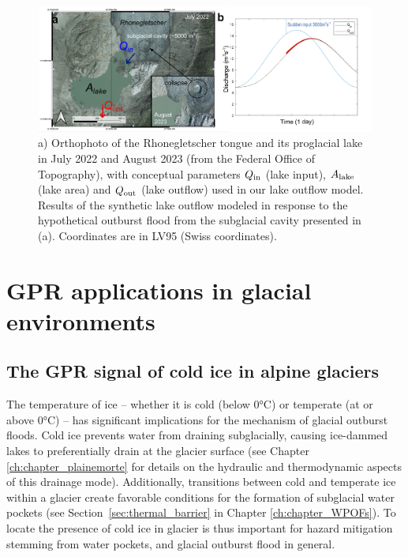 \begin{figure}[h]
    \centering
    \includegraphics[width=1\textwidth]{chapters/Discussion/WP_rhone.pdf}
    \caption{a) Orthophoto of the Rhonegletscher tongue and its proglacial lake in July 2022 and August 2023 (from the Federal Office of Topography), with conceptual parameters $Q_{\rm in}$ (lake input), $A_{\rm lake}$ (lake area) and $Q_{\rm out}$ (lake outflow) used in our lake outflow model. Results of the synthetic lake outflow modeled in response to the hypothetical outburst flood from the subglacial cavity presented in (a). Coordinates are in LV95 (Swiss coordinates).}
    \label{fig:WP_rhone}
\end{figure}



\section{GPR applications in glacial environments}


\subsection{The GPR signal of cold ice in alpine glaciers}

The temperature of ice -- whether it is cold (below 0°C) or temperate (at or above 0°C) -- has significant implications for the mechanism of glacial outburst floods. Cold ice prevents water from draining subglacially, causing ice-dammed lakes to preferentially drain at the glacier surface (see Chapter \ref{ch:chapter_plainemorte} for details on the hydraulic and thermodynamic aspects of this drainage mode). Additionally, transitions between cold and temperate ice within a glacier create favorable conditions for the formation of subglacial water pockets (see Section~\ref{sec:thermal_barrier} in Chapter \ref{ch:chapter_WPOFs}). To locate the presence of cold ice in glacier is thus important for hazard mitigation stemming from water pockets, and glacial outburst flood in general. 

